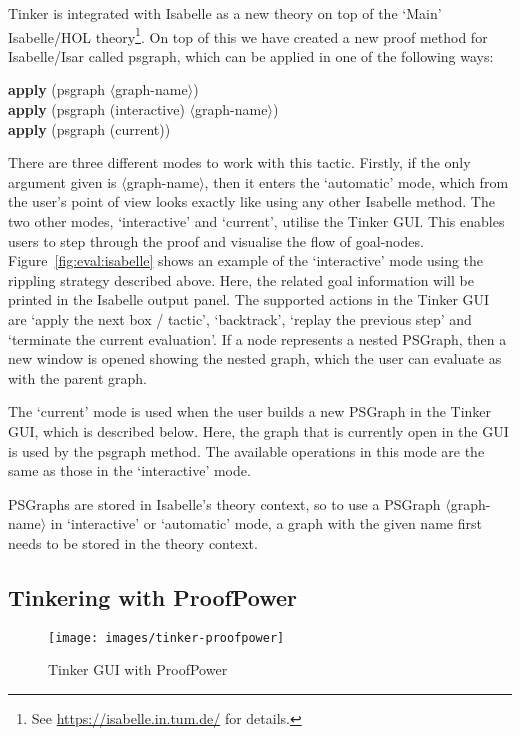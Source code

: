 \documentclass[submission,copyright,creativecommons]{eptcs}
\begin{document}
Tinker is integrated with Isabelle as a new theory on top of the 
`Main' Isabelle/HOL theory\footnote{See \url{https://isabelle.in.tum.de/} for details.}. 
On top of this we have created a new proof method for Isabelle/Isar called
\textsf{psgraph}, which can be applied in one of the following ways:
\begin{tabbing}
\sf\qquad\quad\textbf{apply} (psgraph $\langle$graph-name$\rangle$)\\
\sf\qquad\quad\textbf{apply} (psgraph (interactive) $\langle$graph-name$\rangle$)\\
\sf\qquad\quad\textbf{apply} (psgraph (current))
\end{tabbing}
There are three different modes to work with this tactic. Firstly, if the only argument given is $\langle$graph-name$\rangle$, then it enters the `automatic' mode, which from the user's point of view looks exactly like using any other Isabelle method. The two other modes, `interactive' and `current', utilise the Tinker GUI. This enables users to step through the proof and visualise the flow of goal-nodes. Figure~\ref{fig:eval:isabelle} shows an example of the `interactive' mode using the rippling strategy described above. Here, the related goal information will be printed in the Isabelle output panel. The supported actions in the Tinker GUI are `apply the next box / tactic', `backtrack', `replay the previous step' and `terminate the current evaluation'. If a node represents a nested PSGraph, then a new window is opened showing the nested graph, which the user can evaluate as with the parent graph.

The `current' mode is used when the user builds a new PSGraph in the Tinker GUI, which is described below. Here, the graph that is currently open in the GUI is used by the \textsf{psgraph} method. The available operations in this mode are the same as those in the `interactive' mode.  

PSGraphs are stored in Isabelle's theory context, so to use a PSGraph \textsf{$\langle$graph-name$\rangle$} in `interactive' or `automatic' mode, a graph with the given name first needs to be stored in the theory context.



\subsection{Tinkering with ProofPower}

\begin{figure}
\begin{center}
\centering
\texttt{[image: images/tinker-proofpower]}
\end{center}
\vspace{-15pt}
\caption{Tinker GUI with ProofPower}\label{fig:eval:pp}
\end{figure}
\end{document}
